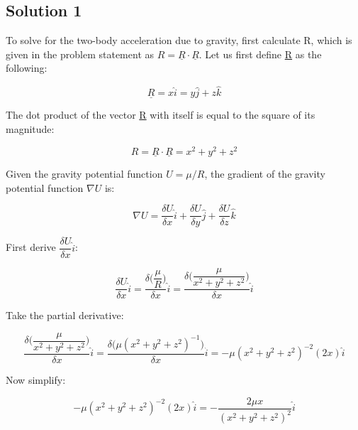 \documentclass[conf]{new-aiaa}
\begin{document}
\subsection{Solution 1} 

To solve for the two-body acceleration due to gravity, first calculate R, which is given in the problem statement as $R = \underline{R} \cdot \underline{R}$. Let us first define \underline{R} as the following: 

\begin{equation}
\underline{R} = x \hat{i} = y \hat{j} + z \hat{k}
\end{equation}

The dot product of the vector \underline{R} with itself is equal to the square of its magnitude: 

\begin{equation}
R = \underline{R} \cdot \underline{R} = x^2 + y^2 + z^2
\label{eq:rdot_square}
\end{equation}

Given the gravity potential function $U = \mu/R$, the gradient of the gravity potential function $ \nabla U $ is:

\begin{equation}
\nabla U = \frac{\delta U}{\delta x} \hat{i} + \frac{\delta U}{\delta y} \hat{j} + \frac{\delta U}{\delta z} \hat{k}  
\end{equation} 

First derive $\dfrac{\delta U}{\delta x} \hat{i}$: 

\begin{equation}
\frac{\delta U}{\delta x} \hat{i} = \dfrac{\delta \Big( \dfrac{\mu}{R} \Big) }{\delta x} \hat{i} = \dfrac{ \delta \Big( \dfrac{\mu}{x^2 + y^2 + z^2} \Big) }{\delta x} \hat{i}
\end{equation}

Take the partial derivative: 

\begin{equation}
\dfrac{ \delta \Big( \dfrac{\mu}{x^2 + y^2 + z^2} \Big) }{\delta x} \hat{i} = \dfrac{ \delta \big(\mu ( x^2 + y^2 + z^2 )^{-1} \big) }{\delta x} \hat{i} = -\mu ( x^2 + y^2 + z^2 )^{-2} ( 2x ) \hat{i}
\end{equation}

Now simplify: 

\begin{equation}
-\mu ( x^2 + y^2 + z^2 )^{-2} ( 2x ) \hat{i} = -\dfrac{2 \mu x}{ (x^2 + y^2 + z^2 )^2 } \hat{i}
\end{equation}
\end{document}

